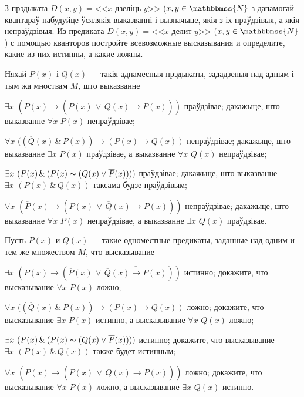 \begin{problemList}
{\begin{belarusianEnumerate}
\end{belarusianEnumerate}
}

\bigskip

\problemItemSimple
{З прэдыката $D(x, y) = \text{<<} x \,\,\text{дзеліць}\,\, y\text{>>}$ ($x, y \in \mathbbmss{N}$ з дапамогай квантараў пабудуйце ўсялякія выказванні і вызначыце, якія з іх праўдзівыя, а якія непраўдзівыя.}
{Из предиката $D(x, y) = \text{<<} x \,\,\text{делит}\,\,
y\text{>>}$ ($x, y \in \mathbbmss{N}$) с помощью
кванторов постройте всевозможные высказывания и определите, какие из
них истинны, а какие ложны.}

\bigskip

\problemItemSimple
{%
Няхай $P(x)$ і $Q(x)$ --- такія аднамесныя прэдыкаты, зададзеныя над адным і тым жа мноствам $M$, што выказванне
\begin{belarusianEnumerate}
	\item $\exists x \,\, (P(x) \to (\overline{P}(x) \,\vee\, \overline{\overline{Q}(x) \to P(x)}))$ праўдзівае; дакажыце, што выказванне $\forall x \,\, P(x)$ непраўдзівае;
	\item $\forall x \,\, ((\overline{Q}(x) \,\&\, P(x)) \to (P(x) \to Q(x))$ непраўдзівае; дакажыце, што выказванне $\exists x \,\, P(x)$ праўдзівае, а выказванне $\forall x \,\, Q(x)$ непраўдзівае;
	\item $\exists x \,\, (P(x) \,\&\, (P(x) \thicksim (Q(x) \vee \overline{P}(x))))$ праўдзівае; дакажыце, што выказванне \\ $\exists x \,\, (P(x) \,\&\, Q(x))$ таксама будзе праўдзівым;
	\item $\forall x \,\, (\overline{P}(x) \to (P(x) \,\vee\, \overline{\overline{Q}(x) \to P(x)}))$ непраўдзівае; дакажыце, што выказванне $\forall x \,\, P(x)$ непраўдзівае, а выказванне $\exists x \,\, Q(x)$ праўдзівае.
\end{belarusianEnumerate}
\textbf{}
\vspace{-1.5em}
}
{%
Пусть $P(x)$ и $Q(x)$ --- такие одноместные предикаты, заданные над
одним и тем же множеством $M$, что высказывание
\begin{russianEnumerate}
	\item $\exists x \,\, (P(x) \to (\overline{P}(x) \,\vee\, \overline{\overline{Q}(x) \to P(x)}))$ истинно; докажите, что высказывание $\forall x \,\, P(x)$ ложно;
	\item $\forall x \,\, ((\overline{Q}(x) \,\&\, P(x)) \to (P(x) \to Q(x))$ ложно; докажите, что высказывание $\exists x \,\, P(x)$ истинно, а высказывание $\forall x \,\, Q(x)$ ложно;
	\item $\exists x \,\, (P(x) \,\&\, (P(x) \thicksim (Q(x) \vee \overline{P}(x))))$ истинно; докажите, что высказывание \\ $\exists x \,\, (P(x) \,\&\, Q(x))$ также будет истинным;
	\item $\forall x \,\, (\overline{P}(x) \to (P(x) \,\vee\, \overline{\overline{Q}(x) \to P(x)}))$ ложно; докажите, что высказывание $\forall x \,\, P(x)$ ложно, а высказывание $\exists x \,\, Q(x)$ истинно.
\end{russianEnumerate}
}


\end{problemList}
